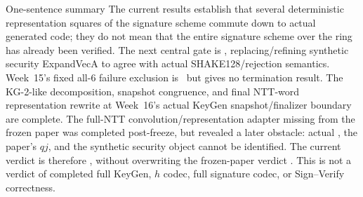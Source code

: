 \documentclass[11pt,a4paper]{article}
\begin{document}
\begin{takeaway}{One-sentence summary}
The current results establish that several deterministic representation squares
of the signature scheme commute down to actual generated code; they do not mean
that the entire signature scheme over the ring has already been verified.
The next central gate is
, replacing/refining synthetic
security ExpandVecA to agree with actual SHAKE128/rejection semantics.
Week~15's fixed all-6 failure exclusion is \statusproved\ but gives no
termination result. The KG-2-like decomposition, snapshot congruence, and final
NTT-word representation rewrite at Week~16's actual KeyGen snapshot/finalizer
boundary are complete. The full-NTT convolution/representation adapter missing
from the frozen paper was completed post-freeze, but revealed a later obstacle:
actual , the paper's \(qj\), and the synthetic security object
cannot be identified. The current verdict is therefore \CurrentGate, without
overwriting the frozen-paper verdict \FrozenPaperGate. This is not a verdict
of completed full KeyGen, \(h\) codec, full signature codec, or Sign--Verify
correctness.
\end{takeaway}

\tableofcontents
\clearpage








\appendix




\end{document}
